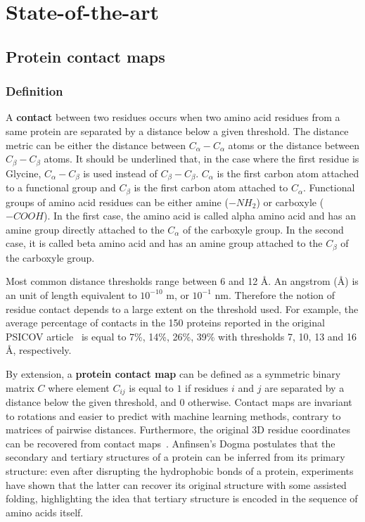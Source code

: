 \chapter{State-of-the-art}

\section{Protein contact maps}

    \subsection{Definition}

        A \textbf{contact} between two residues occurs when two amino acid residues from a same protein are separated by a distance below a given threshold.
        The distance metric can be either the distance between $C_{\alpha}-C_{\alpha}$ atoms or the distance between $C_{\beta}-C_{\beta}$ atoms.
        It should be underlined that, in the case where the first residue is Glycine, $C_{\alpha}-C_{\beta}$ is used instead of $C_{\beta}-C_{\beta}$.
        $C_{\alpha}$ is the first carbon atom attached to a functional group and $C_{\beta}$ is the first carbon atom attached to $C_{\alpha}$.
        Functional groups of amino acid residues can be either
        amine ($-NH_2$) or carboxyle ($-COOH$). In the first case, the amino acid is called alpha amino acid and has an amine group
        directly attached to the $C_{\alpha}$ of the carboxyle group. In the second case, it is called beta amino acid and has an amine group attached to 
        the $C_{\beta}$ of the carboxyle group.

        Most common distance thresholds range between 6 and 12 \AA{}. An angstrom (\AA{}) is an unit of length equivalent to $10^{-10}$ m, or $10^{-1}$ nm.
        Therefore the notion of residue contact depends to a large extent on the threshold used.
        For example, the average percentage of contacts in the 150 proteins reported in the original PSICOV article~\cite{doi:10.1093/bioinformatics/btr638}
        is equal to 7\%, 14\%, 26\%, 39\% with thresholds 7, 10, 13 and 16 \AA{}, respectively.

        By extension, a \textbf{protein contact map} can be defined as a symmetric binary matrix $C$ where element $C_{ij}$ is equal to $1$ if residues $i$ and $j$
        are separated by a distance below the given threshold, and $0$ otherwise. Contact maps are invariant to rotations and easier to predict
        with machine learning methods, contrary to matrices of pairwise distances. Furthermore, the original 3D residue coordinates can be recovered from
        contact maps~\cite{10.1007/978-3-540-72031-7_53}. Anfinsen's Dogma postulates that the secondary and tertiary structures 
        of a protein can be inferred from its primary structure: even after disrupting the hydrophobic bonds of a protein, experiments have shown
        that the latter can recover its original structure with some assisted folding, highlighting the idea that tertiary structure is encoded in the sequence
        of amino acids itself.

